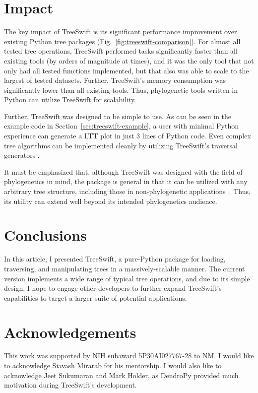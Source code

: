 \section{Impact}\label{sec:treeswift-impact}
The key impact of TreeSwift is its significant performance improvement over existing Python tree packages (Fig.~\ref{fig:treeswift-comparison}). For almost all tested tree operations, TreeSwift performed tasks significantly faster than all existing tools (by orders of magnitude at times), and it was the only tool that not only had all tested functions implemented, but that also was able to scale to the largest of tested datasets. Further, TreeSwift's memory consumption was significantly lower than all existing tools. Thus, phylogenetic tools written in Python can utilize TreeSwift for scalability.

Further, TreeSwift was designed to be simple to use. As can be seen in the example code in Section~\ref{sec:treeswift-example}, a user with minimal Python experience can generate a \gls{LTT} plot in just 3 lines of Python code. Even complex tree algorithms can be implemented cleanly by utilizing TreeSwift's traversal generators \cite{Balaban2019}.

It must be emphasized that, although TreeSwift was designed with the field of phylogenetics in mind, the package is general in that it can be utilized with any arbitrary tree structure, including those in non-phylogenetic applications~\cite{Moshiri2018b}. Thus, its utility can extend well beyond its intended phylogenetics audience.

\section{Conclusions}\label{sec:treeswift-conclusions}
In this article, I presented TreeSwift, a pure-Python package for loading, traversing, and manipulating trees in a massively-scalable manner. The current version implements a wide range of typical tree operations, and due to its simple design, I hope to engage other developers to further expand TreeSwift's capabilities to target a larger suite of potential applications.

\section{Acknowledgements}
This work was supported by NIH subaward 5P30AI027767-28 to NM. I would like to acknowledge Siavash Mirarab for his mentorship. I would also like to acknowledge Jeet Sukumaran and Mark Holder, as DendroPy provided much motivation during TreeSwift's development.

\acktreeswift

